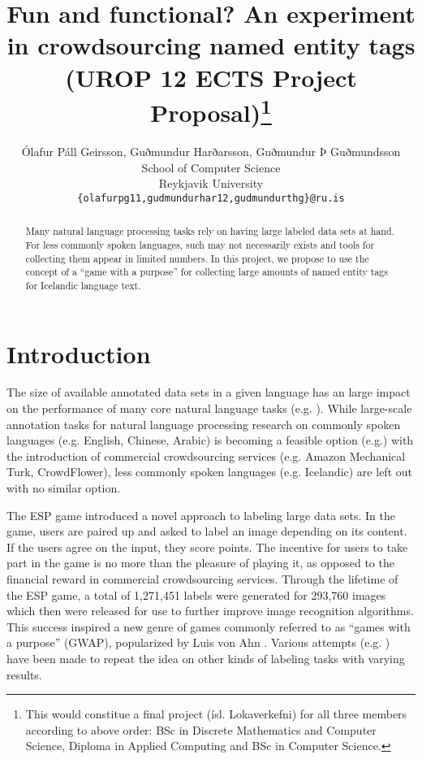 \documentclass[11pt]{article}
\title{
    Fun and functional? An experiment in crowdsourcing named entity tags\\
    (UROP 12 ECTS Project Proposal)\thanks{This would constitue a final project (ísl. Lokaverkefni) for all three members according to above order: BSc in Discrete Mathematics and Computer Science, Diploma in Applied Computing and BSc in Computer Science.}
}
\author{Ólafur Páll Geirsson, Guðmundur Harðarsson, Guðmundur Þ Guðmundsson \\
    School of Computer Science \\ 
    Reykjavik University \\
    {\tt \{olafurpg11,gudmundurhar12,gudmundurthg\}@ru.is}
  }
\date{}
\begin{document}
\maketitle


\begin{abstract}
    Many natural language processing tasks rely on having large labeled data
    sets at hand.  For less commonly spoken languages, such may not necessarily
    exists and tools for collecting them appear in limited numbers. In this
    project, we propose to use the concept of a “game with a purpose” for
    collecting large amounts of named entity tags for Icelandic language text.
\end{abstract}

\section{Introduction}
The size of available annotated data sets in a given language has an large
impact on the performance of many core natural language tasks (e.g.\@
\cite{banko_scaling_2001}). While large-scale annotation tasks for natural
language processing research on commonly spoken languages (e.g. English,
Chinese, Arabic) is becoming a feasible option (e.g.\@ \cite{snow_cheap_2008})
with the introduction of commercial crowdsourcing services (e.g. Amazon
Mechanical Turk, CrowdFlower), less commonly spoken languages (e.g. Icelandic)
are left out with no similar option. 

The ESP game \cite{von_ahn_labeling_2004} introduced a novel approach to
labeling large data sets. In the game, users are paired up and asked to label
an image depending on its content. If the users agree on the input, they score
points. The incentive for users to take part in the game is no more than the
pleasure of playing it, as opposed to the financial reward in commercial
crowdsourcing services. Through the lifetime of the ESP game, a total of
1,271,451 labels were generated for 293,760 images which then were released for
use to further improve image recognition algorithms. This success inspired a new genre of
games commonly referred to as “games with a purpose” (GWAP), popularized by Luis von Ahn
. Various attempts (e.g.
\cite{von_ahn_improving_2006,von_ahn_peekaboom:_2006-1,scharl_leveraging_2012,siorpaes_games_2008})
have been made to repeat the idea on other kinds of labeling tasks with varying
results.
\end{document}
